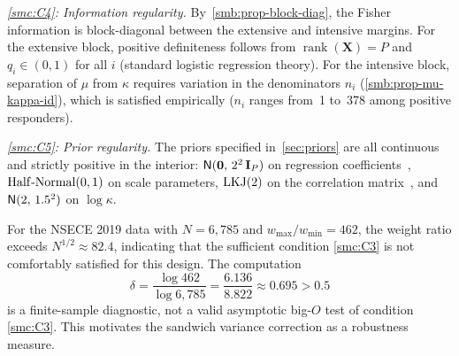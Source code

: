\medskip\noindent\textit{\ref{smc:C4}: Information regularity.}\enspace
By~\cref{smb:prop-block-diag}, the Fisher information is
block-diagonal between the extensive and intensive margins.  For the
extensive block, positive definiteness follows from $\operatorname{rank}(\mathbf{X}) = P$
and $q_i \in (0,1)$ for all $i$ (standard logistic regression theory).
For the intensive block, separation of $\mu$ from $\kappa$ requires
variation in the denominators $n_i$
(\cref{smb:prop-mu-kappa-id}), which is satisfied empirically
($n_i$ ranges from~1 to~378 among positive responders).  \checkmark

\medskip\noindent\textit{\ref{smc:C5}: Prior regularity.}\enspace
The priors specified in~\cref{sec:priors} are all continuous and
strictly positive in the interior:
$\textsf{N}(\mathbf{0},\, 2^2\,\mathbf{I}_P)$ on regression coefficients~\citep{GelmanEtAl2008},
$\operatorname{Half\text{-}Normal}(0,1)$ on scale parameters,
$\operatorname{LKJ}(2)$ on the correlation matrix~\citep{LewandowskiEtAl2009}, and
$\textsf{N}(2,\, 1.5^2)$ on $\log\kappa$.  \checkmark


\begin{proposition}
\label{smc:prop-weight-diagnostic}
  For the NSECE 2019 data with $N = 6{,}785$ and
  $w_{\max}/w_{\min} = 462$\textup{,} the weight ratio exceeds
  $N^{1/2} \approx 82.4$\textup{,} indicating that the sufficient
  condition \ref{smc:C3} is not comfortably satisfied for this design.
  The computation
  \begin{equation}\label{smc:eq-delta}
    \delta
    = \frac{\log 462}{\log 6{,}785}
    = \frac{6.136}{8.822}
    \approx 0.695
    > 0.5
  \end{equation}
  is a finite-sample diagnostic, not a valid asymptotic big-$O$ test
  of condition \ref{smc:C3}.  This motivates the sandwich variance
  correction as a robustness measure.
\end{proposition}

